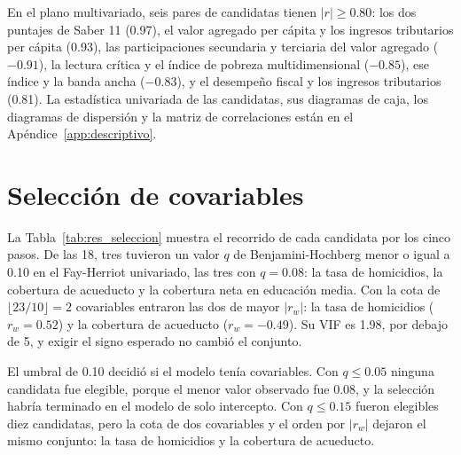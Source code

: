 En el plano multivariado, seis pares de candidatas tienen $|r| \geq 0.80$: los dos puntajes de Saber 11 (0.97), el valor agregado per cápita y los ingresos tributarios per cápita (0.93), las participaciones secundaria y terciaria del valor agregado ($-0.91$), la lectura crítica y el índice de pobreza multidimensional ($-0.85$), ese índice y la banda ancha ($-0.83$), y el desempeño fiscal y los ingresos tributarios (0.81). La estadística univariada de las candidatas, sus diagramas de caja, los diagramas de dispersión y la matriz de correlaciones están en el Apéndice~\ref{app:descriptivo}.

\section{Selección de covariables}
\label{sec:res_seleccion}

La Tabla~\ref{tab:res_seleccion} muestra el recorrido de cada candidata por los cinco pasos. De las 18, tres tuvieron un valor $q$ de Benjamini-Hochberg menor o igual a 0.10 en el Fay-Herriot univariado, las tres con $q = 0.08$: la tasa de homicidios, la cobertura de acueducto y la cobertura neta en educación media. Con la cota de $\lfloor 23/10 \rfloor = 2$ covariables entraron las dos de mayor $|r_w|$: la tasa de homicidios ($r_w = 0.52$) y la cobertura de acueducto ($r_w = -0.49$). Su VIF es 1.98, por debajo de 5, y exigir el signo esperado no cambió el conjunto.

El umbral de 0.10 decidió si el modelo tenía covariables. Con $q \leq 0.05$ ninguna candidata fue elegible, porque el menor valor observado fue 0.08, y la selección habría terminado en el modelo de solo intercepto. Con $q \leq 0.15$ fueron elegibles diez candidatas, pero la cota de dos covariables y el orden por $|r_w|$ dejaron el mismo conjunto: la tasa de homicidios y la cobertura de acueducto.

